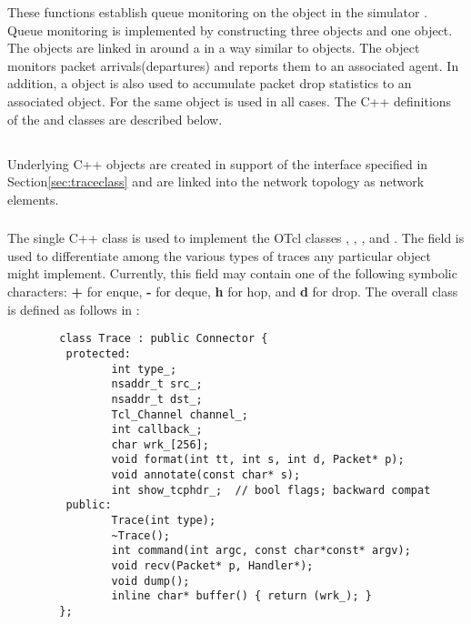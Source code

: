 These functions establish queue monitoring on the  object
in the simulator .
Queue monitoring is implemented by constructing three 
objects and one  object.
The  objects are linked in around a  in a way
similar to  objects.
The  object monitors packet arrivals(departures)
and reports them to an associated  agent.
In addition, a  object is also used to accumulate
packet drop statistics to an associated  object.
For  the same  object is used
in all cases.
The C++ definitions of the  and 
classes are described below.

\subsection{}

Underlying C++ objects are created in support of the interface specified
in Section\ref{sec:traceclass} and are linked into the network topology
as network elements.

\subsubsection{}

The single C++  class is used to implement the OTcl
classes , , ,
and .
The  field is used to differentiate among the
various types of
traces any particular  object might implement.
Currently, this field may contain one of the following symbolic characters:
{\bf +} for enque, {\bf -} for deque, {\bf h} for hop, and
{\bf d} for drop.
The overall class is defined as follows in :
\begin{small}
\begin{verbatim}
        class Trace : public Connector {
         protected:
                int type_;
                nsaddr_t src_;
                nsaddr_t dst_;
                Tcl_Channel channel_;
                int callback_;
                char wrk_[256];
                void format(int tt, int s, int d, Packet* p);
                void annotate(const char* s);
                int show_tcphdr_;  // bool flags; backward compat
         public:
                Trace(int type);
                ~Trace();
                int command(int argc, const char*const* argv);
                void recv(Packet* p, Handler*);
                void dump();
                inline char* buffer() { return (wrk_); }
        };
\end{verbatim}
\end{small}

